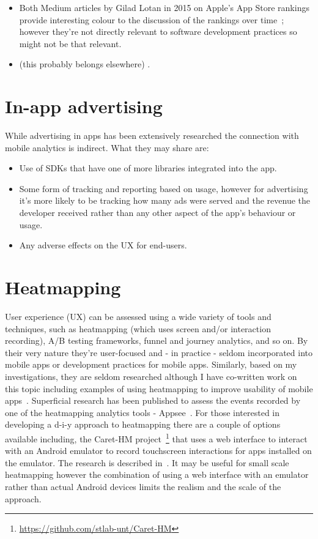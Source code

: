 \begin{itemize}
    
    \item Both Medium articles by Gilad Lotan in 2015 on Apple's App Store rankings provide interesting colour to the discussion of the rankings over time~\citep{lotan2015_apple_apps_and_algorithmic_glitches, lotan2015_apples_app_charts}; however they're not directly relevant to software development practices so might not be that relevant.
    
    \item (this probably belongs elsewhere) \citet{not_cited_yet_necmiye2017_a_slr_opinion_mining_studies_from_mobile_app_store_reviews}. 
    
\end{itemize}


\section{In-app advertising}
While advertising in apps has been extensively researched the connection with mobile analytics is indirect. What they may share are:
\begin{itemize}
    \item Use of SDKs that have one of more libraries integrated into the app.
    \item Some form of tracking and reporting based on usage, however for advertising it's more likely to be tracking how many ads were served and the revenue the developer received rather than any other aspect of the app's behaviour or usage.
    \item Any adverse effects on the UX for end-users.
\end{itemize}


\section{Heatmapping}
User experience (UX) can be assessed using a wide variety of tools and techniques, such as heatmapping (which uses screen and/or interaction recording), A/B testing frameworks, funnel and journey analytics, and so on. By their very nature they're user-focused and - in practice - seldom incorporated into mobile apps or development practices for mobile apps. Similarly, based on my investigations, they are seldom researched although I have co-written work on this topic including examples of using heatmapping to improve usability of mobile apps~\cite{harty_aymer_playbook_2016}. Superficial research has been published to assess the events recorded by one of the heatmapping analytics tools - Appsee~\citep{yildirim2019_ux_analytics_for_android_platforms}. For those interested in developing a d-i-y approach to heatmapping there are a couple of options available including, the Caret-HM project~\footnote{\url{https://github.com/stlab-unt/Caret-HM}} that uses a web interface to interact with an Android emulator to record touchscreen interactions for apps installed on the emulator. The research is described in~\citep{nurmuradov2017_caret-hm-heatmapping-android-emulator}. It may be useful for small scale heatmapping however the combination of using a web interface with an emulator rather than actual Android devices limits the realism and the scale of the approach.

